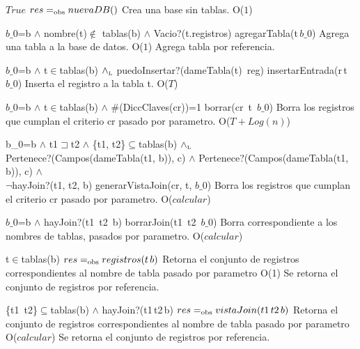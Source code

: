  
 {$True$}
 {$res =_{\mathrm{obs}} nuevaDB()$}
 {Crea una base sin tablas.}
 {O($1$)}
 {}

 {$b\_0$=b $\land$ nombre(t)$\notin$ tablas(b) $\land$ Vacio?(t.registros)}
 {agregarTabla(t\,$b\_0$)}
 {Agrega una tabla a la base de datos.}
 {O($1$)}
 {Agrega tabla por referencia.} 
 
 {$b\_0$=b $\land$ t$\in$tablas(b) $\land_{\mathrm{\scriptscriptstyle{L}}}$ puedoInsertar?(dameTabla(t)\, reg)}
 {insertarEntrada(r\,t \,$b\_0$)}
 {Inserta el registro a la tabla t.}
 {O($T$)}
 {} 
 
 {$b\_0$=b $\land$ t$\in$tablas(b) $\land$ \#(DiccClaves(cr))=1}
 {borrar(cr\, t\, $b\_0$)}
 {Borra los registros que cumplan el criterio cr pasado por parametro.}
 {O($T + Log(n)$)}
 {} 	

 {b\_0=b $\land$ t1$\sqsupset$t2 $\land$ \{t1, t2\}$\subseteq$tablas(b) $\land_{\mathrm{\scriptscriptstyle{L}}}$ \\Pertenece?(Campos(dameTabla(t1, b)), c) $\land$ Pertenece?(Campos(dameTabla(t1, b)), c) $\land$ \\$\neg$hayJoin?(t1, t2, b)}
 {generarVistaJoin(cr, t, $b\_0$)}
 {Borra los registros que cumplan el criterio cr pasado por parametro.}
 {O($calcular$)}
 {} 	

 {$b\_0$=b $\land$ hayJoin?(t1\, t2\, b)}
 {borrarJoin(t1\, t2\, $b\_0$)}
 {Borra correspondiente a los nombres de tablas, pasados por parametro.}
 {O($calcular$)}
 {}


 {t$\in$tablas(b)}
 {$res =_{\mathrm{obs}} registros(t\, b)$}
 {Retorna el conjunto de registros correspondientes al nombre de tabla pasado por parametro}
 {O(1)}
 {Se retorna el conjunto de registros por referencia.} 


 {\{t1\, t2\}$\subseteq$tablas(b) $\land$ hayJoin?(t1\,t2\,b)}
 {$res =_{\mathrm{obs}} vistaJoin(t1\, t2\, b)$}
 {Retorna el conjunto de registros correspondientes al nombre de tabla pasado por parametro}
 {O($calcular$)}
 {Se retorna el conjunto de registros por referencia.} 

